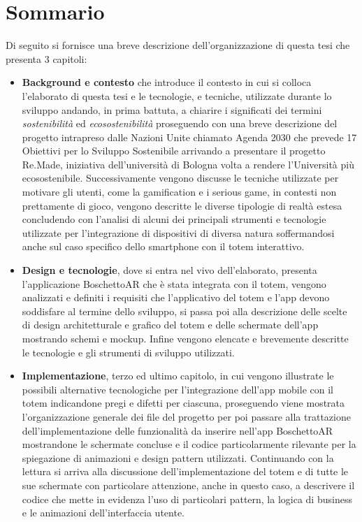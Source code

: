 \section*{Sommario}
Di seguito si fornisce una breve descrizione dell'organizzazione di questa tesi che presenta 3 capitoli: 
\begin{itemize}
    \itemsep1em
    \item \textbf{Background e contesto} che introduce il contesto in cui si colloca l'elaborato di questa tesi e le tecnologie, e tecniche, utilizzate durante lo sviluppo andando, in prima battuta, a chiarire i significati dei termini \textit{sostenibilità} ed \textit{ecosostenibilità} proseguendo con una breve descrizione del progetto intrapreso dalle Nazioni Unite chiamato Agenda 2030 che prevede 17 Obiettivi per lo Sviluppo Sostenibile arrivando a presentare il progetto Re.Made, iniziativa dell'università di Bologna volta a rendere l'Università più ecosostenibile.
    Successivamente vengono discusse le tecniche utilizzate per motivare gli utenti, come la gamification e i serious game, in contesti non prettamente di gioco, vengono descritte le diverse tipologie di realtà estesa concludendo con l'analisi di alcuni dei principali strumenti e tecnologie utilizzate per l'integrazione di dispositivi di diversa natura soffermandosi anche sul caso specifico dello smartphone con il totem interattivo.
    \item \textbf{Design e tecnologie}, dove si entra nel vivo dell'elaborato, presenta l'applicazione BoschettoAR che è stata integrata con il totem, vengono analizzati e definiti i requisiti che l'applicativo del totem e l'app devono soddisfare al termine dello sviluppo, si passa poi alla descrizione delle scelte di design architetturale e grafico del totem e delle schermate dell'app mostrando schemi e mockup. Infine vengono elencate e brevemente descritte le tecnologie e gli strumenti di sviluppo utilizzati.
    \item \textbf{Implementazione}, terzo ed ultimo capitolo, in cui vengono illustrate le possibili alternative tecnologiche per l'integrazione dell'app mobile con il totem indicandone pregi e difetti per ciascuna, proseguendo viene mostrata l'organizzazione generale dei file del progetto per poi passare alla trattazione dell'implementazione delle funzionalità da inserire nell'app BoschettoAR mostrandone le schermate concluse e il codice particolarmente rilevante per la spiegazione di animazioni e design pattern utilizzati. Continuando con la lettura si arriva alla discussione dell'implementazione del totem e di tutte le sue schermate con particolare attenzione, anche in questo caso, a descrivere il codice che mette in evidenza l'uso di particolari pattern, la logica di business e le animazioni dell'interfaccia utente.
\end{itemize}